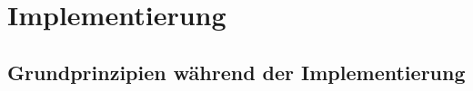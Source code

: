 \chapter{Implementierung} %
\label{sec:implementierung}

\section{Grundprinzipien während der Implementierung} %
\label{sec:datenmodell}

